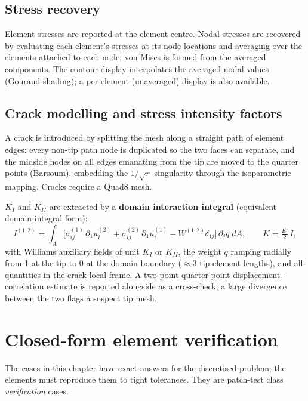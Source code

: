 \documentclass[11pt,a4paper]{report}
\begin{document}
\section{Stress recovery}
Element stresses are reported at the element centre. Nodal stresses are
recovered by evaluating each element's stresses at its node locations and
averaging over the elements attached to each node; von Mises is formed from
the averaged components. The contour display interpolates the averaged nodal
values (Gouraud shading); a per-element (unaveraged) display is also
available.

\section{Crack modelling and stress intensity factors}
\label{sec:crackmethod}
A crack is introduced by splitting the mesh along a straight path of element
edges: every non-tip path node is duplicated so the two faces can separate,
and the midside nodes on all edges emanating from the tip are moved to the
quarter points (Barsoum), embedding the $1/\sqrt{r}$ singularity through the
isoparametric mapping. Cracks require a Quad8 mesh.

$K_I$ and $K_{II}$ are extracted by a \textbf{domain interaction integral}
(equivalent domain integral form):
\begin{equation}
  I^{(1,2)} = \int_A \Big[\sigma^{(1)}_{ij}\,\partial_1 u^{(2)}_i
            + \sigma^{(2)}_{ij}\,\partial_1 u^{(1)}_i
            - W^{(1,2)}\delta_{1j}\Big]\,\partial_j q \; dA,
  \qquad K = \tfrac{E'}{2}\, I,
\end{equation}
with Williams auxiliary fields of unit $K_I$ or $K_{II}$, the weight $q$
ramping radially from 1 at the tip to 0 at the domain boundary
($\approx3$ tip-element lengths), and all quantities in the crack-local frame.
A two-point quarter-point displacement-correlation estimate is reported
alongside as a cross-check; a large divergence between the two flags a suspect
tip mesh.

\chapter{Closed-form element verification}

The cases in this chapter have exact answers for the discretised problem; the
elements must reproduce them to tight tolerances. They are patch-test class
\emph{verification} cases.
\end{document}
